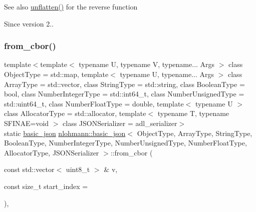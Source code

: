 \begin{DoxySeeAlso}{See also}
\mbox{\hyperlink{classnlohmann_1_1basic__json_a74fa3ab2003f2f6f2b69deaafed9126d}{unflatten()}} for the reverse function
\end{DoxySeeAlso}
\begin{DoxySince}{Since}
version 2.. 
\end{DoxySince}
\mbox{\label{classnlohmann_1_1basic__json_ab5e3e1758c1a52ffe89b1d379ef7fbe1}} 
\subsubsection{\texorpdfstring{from\_cbor()}{from\_cbor()}}
{\footnotesize\ttfamily template$<$template$<$ typename U, typename V, typename... Args $>$ class Object\+Type = std\+::map, template$<$ typename U, typename... Args $>$ class Array\+Type = std\+::vector, class String\+Type  = std\+::string, class Boolean\+Type  = bool, class Number\+Integer\+Type  = std\+::int64\+\_\+t, class Number\+Unsigned\+Type  = std\+::uint64\+\_\+t, class Number\+Float\+Type  = double, template$<$ typename U $>$ class Allocator\+Type = std\+::allocator, template$<$ typename T, typename S\+F\+I\+N\+A\+E=void $>$ class J\+S\+O\+N\+Serializer = adl\+\_\+serializer$>$ \\
static \mbox{\hyperlink{classnlohmann_1_1basic__json}{basic\+\_\+json}} \mbox{\hyperlink{classnlohmann_1_1basic__json}{nlohmann\+::basic\+\_\+json}}$<$ Object\+Type, Array\+Type, String\+Type, Boolean\+Type, Number\+Integer\+Type, Number\+Unsigned\+Type, Number\+Float\+Type, Allocator\+Type, J\+S\+O\+N\+Serializer $>$\+::from\+\_\+cbor (\begin{DoxyParamCaption}\item[{const std\+::vector$<$ uint8\+\_\+t $>$ \&}]{v,  }\item[{const size\+\_\+t}]{start\+\_\+index = {} }\end{DoxyParamCaption})\hspace{0.3cm}{\ttfamily [inline]}, {\ttfamily [static]}}



